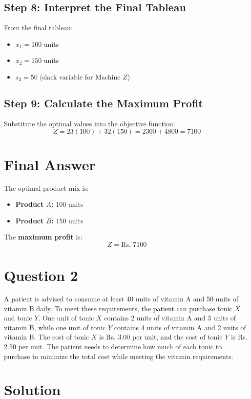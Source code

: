 \documentclass{article}
\begin{document}
\subsection*{Step 8: Interpret the Final Tableau}
From the final tableau:
\begin{itemize}
    \item \( x_1 = 100 \) units
    \item \( x_2 = 150 \) units
    \item \( s_3 = 50 \) (slack variable for Machine \( Z \))
\end{itemize}

\subsection*{Step 9: Calculate the Maximum Profit}
Substitute the optimal values into the objective function:
\[
Z = 23(100) + 32(150) = 2300 + 4800 = 7100
\]

\section*{Final Answer}
The optimal product mix is:
\begin{itemize}
    \item \textbf{Product \( A \):} \( 100 \) units
    \item \textbf{Product \( B \):} \( 150 \) units
\end{itemize}

The \textbf{maximum profit} is:
\[
Z = \text{Rs. } 7100
\]

\newpage
\section*{Question 2}
A patient is advised to consume at least 40 units of vitamin A and 50 units of vitamin B daily. To meet these requirements, the patient can purchase tonic \( X \) and tonic \( Y \). One unit of tonic \( X \) contains 2 units of vitamin A and 3 units of vitamin B, while one unit of tonic \( Y \) contains 4 units of vitamin A and 2 units of vitamin B. The cost of tonic \( X \) is Rs. 3.00 per unit, and the cost of tonic \( Y \) is Rs. 2.50 per unit. The patient needs to determine how much of each tonic to purchase to minimize the total cost while meeting the vitamin requirements.

\section*{Solution}
\end{document}
